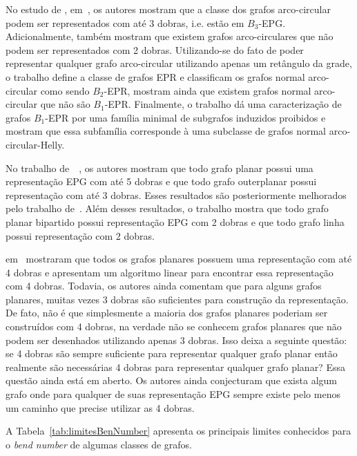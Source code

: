 No estudo de \citeauthor{alcon2016}, em~\cite{alcon2016}, os autores mostram que a classe dos grafos arco-circular podem ser representados com até 3 dobras, i.e. estão em $B_3$-EPG. Adicionalmente, também mostram que existem grafos arco-circulares que não podem ser representados com 2 dobras. Utilizando-se do fato de poder representar qualquer grafo arco-circular utilizando apenas um retângulo da grade, o trabalho define a classe de grafos EPR e classificam os grafos normal arco-circular como sendo $B_2$-EPR, mostram ainda que existem grafos  normal arco-circular que não são $B_1$-EPR. Finalmente, o trabalho dá uma caracterização de grafos $B_1$-EPR por uma família minimal de subgrafos induzidos proibidos e mostram que essa subfamília corresponde à uma subclasse de grafos normal arco-circular-Helly.

No trabalho de~\citeauthor{biedl2010}~\cite{biedl2010}, os autores mostram que todo grafo planar possui uma representação EPG com até 5 dobras e que todo grafo outerplanar possui representação com até 3 dobras. Esses  resultados são posteriormente melhorados pelo trabalho de~\cite{daniel2014b}. Além desses resultados, o trabalho mostra que todo grafo planar bipartido possui representação EPG com 2 dobras e que todo grafo linha possui representação com 2 dobras. 


\citeauthor{daniel2014b} em~\cite{daniel2014b} mostraram que todos os grafos planares possuem uma representação com até 4 dobras e apresentam um algoritmo linear para encontrar essa representação com 4 dobras. Todavia, os autores ainda comentam que para alguns grafos planares, muitas vezes 3 dobras são suficientes para construção da representação. De fato, não é que simplesmente a maioria dos grafos planares poderiam ser construídos com 4 dobras, na verdade não se conhecem grafos planares que não podem ser desenhados utilizando apenas 3 dobras.   Isso deixa a seguinte questão: se 4 dobras são sempre suficiente para representar qualquer grafo planar então realmente são necessárias 4 dobras para representar qualquer grafo planar? Essa questão ainda está em aberto. Os autores ainda conjecturam que exista algum grafo onde para qualquer de suas representação EPG sempre existe pelo menos um caminho que precise utilizar as 4 dobras.

A Tabela~\ref{tab:limitesBenNumber} apresenta os principais limites conhecidos para o \textit{bend number} de algumas classes de grafos.  





